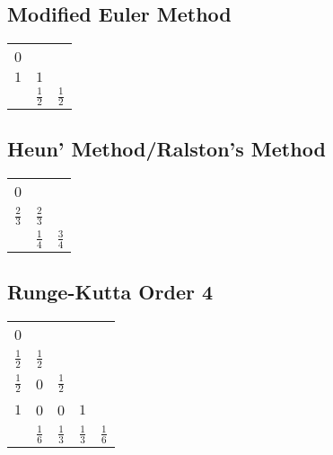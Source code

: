 \documentclass[../main-sheet.tex]{subfiles}
\begin{document}
\subsection{Modified Euler Method}
\begin{table}[H]
    \centering
    \begin{tabular}{c|cc}
        0 & & \\[.5 em]
        \(1\) & \(1\) & \\[0.5em]
        \hline
        \Tstrut & \(\frac{1}{2} \) & \(\frac{1}{2}\) \\
    \end{tabular}
\end{table}
\subsection{Heun' Method/Ralston's Method}
\begin{table}[H]
    \centering
    \begin{tabular}{c|cc}
        0 & & \\[.5 em]
        \(\frac{2}{3}\) & \(\frac{2}{3}\) & \\[0.5em]
        \hline
        \Tstrut & \(\frac{1}{4}\) & \(\frac{3}{4}\) \\
    \end{tabular}
\end{table}
\subsection{Runge-Kutta Order 4}
\begin{table}[H]
    \centering
    \begin{tabular}{c|cccc}
        0 & & & &\\[.5 em]
        \(\frac{1}{2}\) & \(\frac{1}{2}\) & & & \\[0.5em]
        \(\frac{1}{2}\) & 0 & \(\frac{1}{2}\) & & \\[0.5em]
        \(1\) & 0 & 0& \(1\) & \\[0.5em]
        \hline
        \Tstrut & \(\frac{1}{6}\) & \(\frac{1}{3}\) & \(\frac{1}{3}\) & \(\frac{1}{6}\) \\
    \end{tabular}
\end{table}
\end{document}
